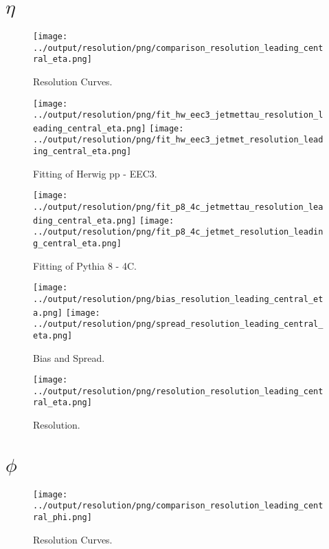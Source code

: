 \documentclass[11pt]{book}
\begin{document}
\section{$\eta$}

\begin{figure}[ht]
\centering
\texttt{[image: ../output/resolution/png/comparison\_resolution\_leading\_central\_eta.png]}
\caption{Resolution Curves.}
\end{figure}


\begin{figure}[ht]
\centering
\texttt{[image: ../output/resolution/png/fit\_hw\_eec3\_jetmettau\_resolution\_leading\_central\_eta.png]}
\texttt{[image: ../output/resolution/png/fit\_hw\_eec3\_jetmet\_resolution\_leading\_central\_eta.png]}
\caption{Fitting of Herwig pp - EEC3.}
\end{figure}

\begin{figure}[ht]
\centering
\texttt{[image: ../output/resolution/png/fit\_p8\_4c\_jetmettau\_resolution\_leading\_central\_eta.png]}
\texttt{[image: ../output/resolution/png/fit\_p8\_4c\_jetmet\_resolution\_leading\_central\_eta.png]}
\caption{Fitting of Pythia 8 - 4C.}
\end{figure}

\begin{figure}[ht]
\centering
\texttt{[image: ../output/resolution/png/bias\_resolution\_leading\_central\_eta.png]}
\texttt{[image: ../output/resolution/png/spread\_resolution\_leading\_central\_eta.png]}
\caption{Bias and Spread.}
\end{figure}


\begin{figure}[ht]
\centering
\texttt{[image: ../output/resolution/png/resolution\_resolution\_leading\_central\_eta.png]}
\caption{Resolution.}
\end{figure}
\clearpage

\section{$\phi$}

\begin{figure}[ht]
\centering
\texttt{[image: ../output/resolution/png/comparison\_resolution\_leading\_central\_phi.png]}
\caption{Resolution Curves.}
\end{figure}
\end{document}
